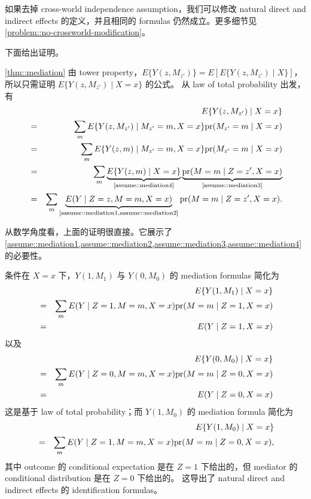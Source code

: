 如果去掉 cross-world independence assumption，我们可以修改 natural direct and indirect effects 的定义，并且相同的 formulas 仍然成立。更多细节见 \cref{problem::no-crossworld-modification}。

下面给出证明。
 

\begin{myproof}{}{\cref{thm::mediation}}
由 tower property，$E\{Y(z,M_{z'})\}=E[E\{Y(z,M_{z'})\mid X\}]$，所以只需证明 $E\{Y(z,M_{z'})\mid X=x\}$ 的公式。
从 law of total probability 出发，有
\begin{eqnarray*}
&& E\{ Y(z, M_{z'})  \mid X=x\}  \\
&=& 
\sum_m E\{ Y(z, M_{z'})  \mid  M_{z'} = m, X=x\} \pr(  M_{z'} = m\mid X=x) \\
&=&
\sum_m E\{ Y(z, m)  \mid  M_{z'} = m, X=x\} \pr(  M_{z'} = m\mid X=x) \\ 
&=& 
\sum_m \underbrace{ E\{ Y(z, m)  \mid    X=x\} }_{\text{\cref{assume::mediation4}} } 
\underbrace{ \pr(  M  = m\mid Z=z' , X=x) }_{\text{\cref{assume::mediation3}} } \\ 
&=&
\sum_m \underbrace{E( Y  \mid  Z=z, M=m,   X=x)}_{ \text{\cref{assume::mediation1,assume::mediation2}} } 
\pr(  M  = m\mid Z=z' , X=x) .
\end{eqnarray*}
\end{myproof}


从数学角度看，上面的证明很直接。它展示了 \cref{assume::mediation1,assume::mediation2,assume::mediation3,assume::mediation4} 的必要性。


条件在 $X=x$ 下，$Y(1,M_1)$ 与 $Y(0,M_0)$ 的 mediation formulas 简化为
\begin{eqnarray*}
&& E\{  Y(1, M_1)\mid X=x \} \\ 
&=& \sum_m E( Y  \mid  Z=1, M=m,   X=x) \textup{pr}(M=m \mid Z=1, X=x)\\
&=& E( Y  \mid  Z=1 ,  X=x)
\end{eqnarray*}
以及
\begin{eqnarray*}
&&E\{  Y(0, M_0)\mid X=x \}  \\
&=& \sum_m E( Y  \mid  Z=0, M=m,   X=x) \textup{pr}(M=m \mid Z=0, X=x)\\
&=& E( Y  \mid  Z=0 ,  X=x)
\end{eqnarray*}
这是基于 law of total probability；而 $Y(1,M_0)$ 的 mediation formula 简化为
\begin{eqnarray*}
&&E\{  Y(1, M_0)\mid X=x \}  \\
&=&  \sum_m E( Y  \mid  Z=1, M=m,   X=x) \textup{pr}(M=m \mid Z=0, X=x),
\end{eqnarray*}
其中 outcome 的 conditional expectation 是在 $Z=1$ 下给出的，但 mediator 的 conditional distribution 是在 $Z=0$ 下给出的。
这导出了 natural direct and indirect effects 的 identification formulas。

